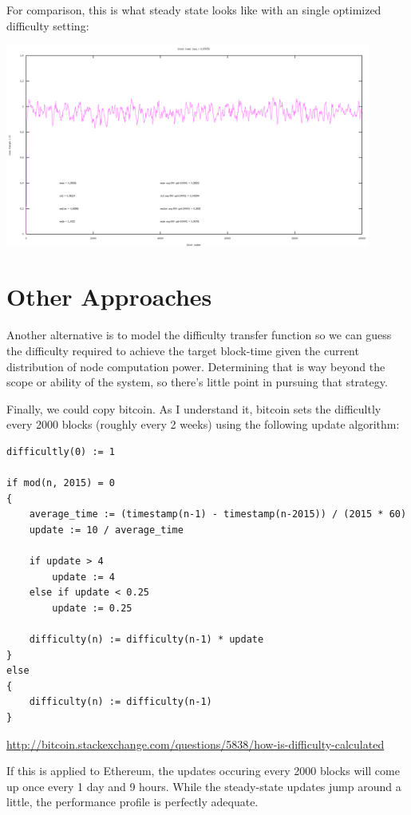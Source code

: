 \documentclass[10pt,a4paper]{article}
\begin{document}
\newpage

For comparison, this is what steady state looks like with an single optimized difficulty setting:
\begin{center}
\includegraphics[width=12cm]{SimulationGraphs/simulation_avg-500_upd-none.png}
\end{center}

\section*{Other Approaches}
	Another alternative is to model the difficulty transfer function so we can guess the difficulty required to achieve the target block-time given the current distribution of node computation power. Determining that is way beyond the scope or ability of the system, so there's little point in pursuing that strategy. 
	
	Finally, we could copy bitcoin. As I understand it, bitcoin sets the difficultly every 2000 blocks (roughly every 2 weeks) using the following update algorithm:
	
\begin{verbatim}
difficultly(0) := 1

if mod(n, 2015) = 0
{
    average_time := (timestamp(n-1) - timestamp(n-2015)) / (2015 * 60)
    update := 10 / average_time
	
    if update > 4
        update := 4
    else if update < 0.25
        update := 0.25
        
    difficulty(n) := difficulty(n-1) * update 
}
else
{
    difficulty(n) := difficulty(n-1)
}
\end{verbatim}

\url{http://bitcoin.stackexchange.com/questions/5838/how-is-difficulty-calculated}

\newpage

If this is applied to Ethereum, the updates occuring every 2000 blocks will come up once every 1 day and 9 hours. While the steady-state updates jump around a little, the performance profile is perfectly adequate. 
\end{document}
